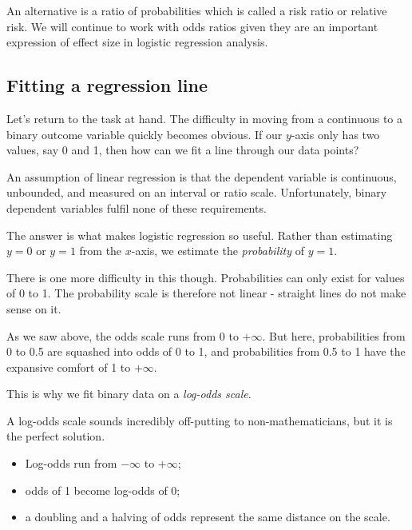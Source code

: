\documentclass[
  12pt,
  krantz2]{krantz}
\providecommand{\tightlist}{%
  \setlength{\itemsep}{0pt}\setlength{\parskip}{0pt}}
\begin{document}
An alternative is a ratio of probabilities which is called a risk ratio or relative risk.
We will continue to work with odds ratios given they are an important expression of effect size in logistic regression analysis.

\hypertarget{fitting-a-regression-line}{%
\subsection{Fitting a regression line}\label{fitting-a-regression-line}}


Let's return to the task at hand.
The difficulty in moving from a continuous to a binary outcome variable quickly becomes obvious.
If our \(y\)-axis only has two values, say 0 and 1, then how can we fit a line through our data points?

An assumption of linear regression is that the dependent variable is continuous, unbounded, and measured on an interval or ratio scale.
Unfortunately, binary dependent variables fulfil none of these requirements.

The answer is what makes logistic regression so useful.
Rather than estimating \(y=0\) or \(y=1\) from the \(x\)-axis, we estimate the \emph{probability} of \(y=1\).

There is one more difficulty in this though.
Probabilities can only exist for values of 0 to 1.
The probability scale is therefore not linear - straight lines do not make sense on it.

As we saw above, the odds scale runs from 0 to \(+\infty\).
But here, probabilities from 0 to 0.5 are squashed into odds of 0 to 1, and probabilities from 0.5 to 1 have the expansive comfort of 1 to \(+\infty\).

This is why we fit binary data on a \emph{log-odds scale}.

A log-odds scale sounds incredibly off-putting to non-mathematicians, but it is the perfect solution.

\begin{itemize}
\tightlist
\item
  Log-odds run from \(-\infty\) to \(+\infty\);
\item
  odds of 1 become log-odds of 0;
\item
  a doubling and a halving of odds represent the same distance on the scale.
\end{itemize}
\end{document}
